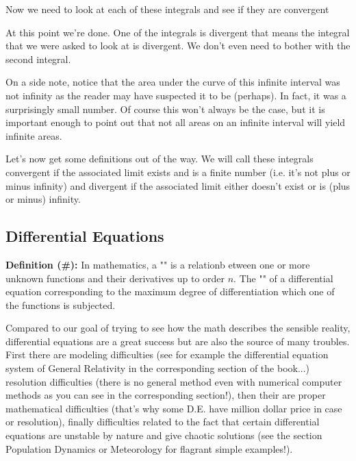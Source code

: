 	\begin{tcolorbox}[colframe=black,colback=white,sharp corners]
	Now we need to look at each of these integrals and see if they are convergent
	
	At this point we're done.  One of the integrals is divergent that means the integral that we were asked to look at is divergent.  We don't even need to bother with the second integral.
	\end{tcolorbox}
	On a side note, notice that the area under the curve of this infinite interval was not infinity as the reader may have suspected it to be (perhaps).  In fact, it was a surprisingly small number.  Of course this won't always be the case, but it is important enough to point out that not all areas on an infinite interval will yield infinite areas.
 
	Let's now get some definitions out of the way.  We will call these integrals convergent if the associated limit exists and is a finite number (i.e. it's not plus or minus infinity) and divergent if the associated limit either doesn't exist or is (plus or minus) infinity.
	
	\pagebreak
	\subsection{Differential Equations}
	\textbf{Definition (\#\mydef):} In mathematics, a ""  is a relationb etween one or more unknown functions and their derivatives up to order $n$. The "" of a differential equation corresponding to the maximum degree of differentiation which one of the functions is subjected.
	
	Compared to our goal of trying to see how the math describes the sensible reality, differential equations are a great success but are also the source of many troubles. First there are modeling difficulties (see for example the differential equation system of General Relativity in the corresponding section of the book...) resolution difficulties (there is no general method even with numerical computer methods as you can see in the corresponding section!), then their are proper mathematical difficulties (that's why some D.E. have million dollar price in case or resolution), finally difficulties related to the fact that certain differential equations are unstable by nature and give chaotic solutions (see the section Population Dynamics or Meteorology for flagrant simple examples!).
	
